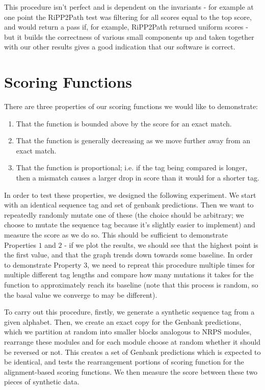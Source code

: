 \documentclass{l4proj}
\begin{document}
This procedure isn't perfect and is dependent on the invariants - for example at one point the RiPP2Path test was filtering for all scores equal to the top score, and would return a pass if, for example, RiPP2Path returned uniform scores - but it builds the correctness of various small components up and taken together with our other results gives a good indication that our software is correct.

\section{Scoring Functions} \label{scoregraphs}

There are three properties of our scoring functions we would like to demonstrate:
\begin{enumerate}
	\item That the function is bounded above by the score for an exact match.
	\item That the function is generally decreasing as we move further away from an exact match.
	\item That the function is proportional; i.e. if the tag being compared is longer, then a mismatch causes a larger drop in score than it would for a 		shorter tag.
\end{enumerate}

In order to test these properties, we designed the following experiment. We start with an identical sequence tag and set of genbank predictions. Then we want to repeatedly randomly mutate one of these (the choice should be arbitrary; we choose to mutate the sequence tag because it's slightly easier to implement) and measure the score as we do so. This should be sufficient to demonstrate Properties \(1\) and \(2\) - if we plot the results, we should see that the highest point is the first value, and that the graph trends down towards some baseline. In order to demonstrate Property \(3\), we need to repreat this procedure multiple times for multiple different tag lengths and compare how many mutations it takes for the function to approximately reach its baseline (note that this process is random, so the basal value we converge to may be different).

To carry out this procedure, firstly, we generate a synthetic sequence tag from a given alphabet. Then, we create an exact copy for the Genbank predictions, which we partition at random into smaller blocks analogous to NRPS modules, rearrange these modules and for each module choose at random whether it should be reversed or not. This creates a set of Genbank predictions which is expected to be identical, and tests the rearrangement portions of scoring function for the alignment-based scoring functions. We then measure the score between these two pieces of synthetic data.
\end{document}
